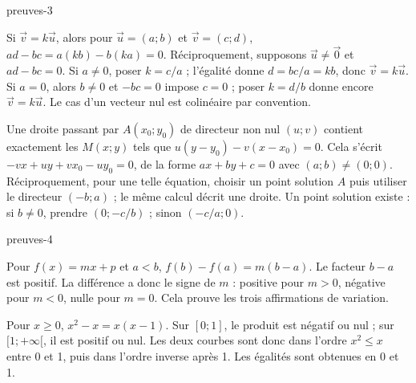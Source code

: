 \begin{blocEdition}{preuves-3}
\begin{demonstration}
Si $\vec v=k\vec u$, alors pour $\vec u=(a;b)$ et $\vec v=(c;d)$, $ad-bc=a(kb)-b(ka)=0$. Réciproquement, supposons $\vec u\ne\vec0$ et $ad-bc=0$. Si $a\ne0$, poser $k=c/a$ ; l’égalité donne $d=bc/a=kb$, donc $\vec v=k\vec u$. Si $a=0$, alors $b\ne0$ et $-bc=0$ impose $c=0$ ; poser $k=d/b$ donne encore $\vec v=k\vec u$. Le cas d’un vecteur nul est colinéaire par convention.
\end{demonstration}
\begin{demonstration}
Une droite passant par $A(x_0;y_0)$ de directeur non nul $(u;v)$ contient exactement les $M(x;y)$ tels que $u(y-y_0)-v(x-x_0)=0$. Cela s’écrit $-vx+uy+vx_0-uy_0=0$, de la forme $ax+by+c=0$ avec $(a;b)\ne(0;0)$. Réciproquement, pour une telle équation, choisir un point solution $A$ puis utiliser le directeur $(-b;a)$ ; le même calcul décrit une droite. Un point solution existe : si $b\ne0$, prendre $(0;-c/b)$ ; sinon $(-c/a;0)$.
\end{demonstration}

\end{blocEdition}
\begin{blocEdition}{preuves-4}
\begin{demonstration}
Pour $f(x)=mx+p$ et $a<b$, $f(b)-f(a)=m(b-a)$. Le facteur $b-a$ est positif. La différence a donc le signe de $m$ : positive pour $m>0$, négative pour $m<0$, nulle pour $m=0$. Cela prouve les trois affirmations de variation.
\end{demonstration}
\begin{demonstration}
Pour $x\ge0$, $x^2-x=x(x-1)$. Sur $[0;1]$, le produit est négatif ou nul ; sur $[1;+\infty[$, il est positif ou nul. Les deux courbes sont donc dans l’ordre $x^2\le x$ entre 0 et 1, puis dans l’ordre inverse après 1. Les égalités sont obtenues en 0 et 1.
\end{demonstration}

\end{blocEdition}
